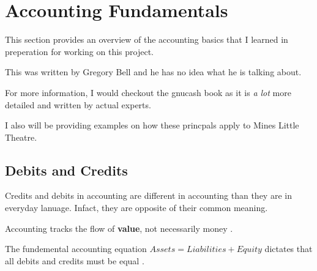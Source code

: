 \newcommand{\JournalEntry}[5]{%
    \begin{tabular}{|l l l|}
        \hline
        \multicolumn{3}{|c|}{\textbf{Entry \##1}}\\
        \multicolumn{2}{|l}{\today} & \multicolumn{1}{r|}{John Smith}\\
        \hline
        Account & Debit & Credit\\
        \hline
        #2 &  & \$#4\\
        #3 & \$#5 & \\
        \hline
    \end{tabular}
}

\newcommand{\TChart}[4]{%
    \begin{tabular}{c|c}
        \multicolumn{2}{c}{\makecell{\textbf{#1}\\(#2)}}\\
        \hline
        Debits & Credit\\
        #3 & #4
    \end{tabular}

}

\chapter{Accounting Fundamentals}

This section provides an overview of the accounting basics that I learned in preperation for working on this project.

This was written by Gregory Bell and he has no idea what he is talking about.

For more information, I would checkout the gnucash book as it is \textit{a lot} more detailed and written by actual experts.

I also will be providing examples on how these princpals apply to Mines Little Theatre.

\section{Debits and Credits}

Credits and debits in accounting are different in accounting than they are in everyday lanuage. Infact, they are opposite of their common meaning.

Accounting tracks the flow of \textbf{value}, not necessarily money \cite{NetsuiteDebitsCredit}. 

The fundemental accounting equation $\textit{Assets} = \textit{Liabilities} + \textit{Equity}$ dictates that all debits and credits must be equal \cite{AccountingCoachDebit}.

